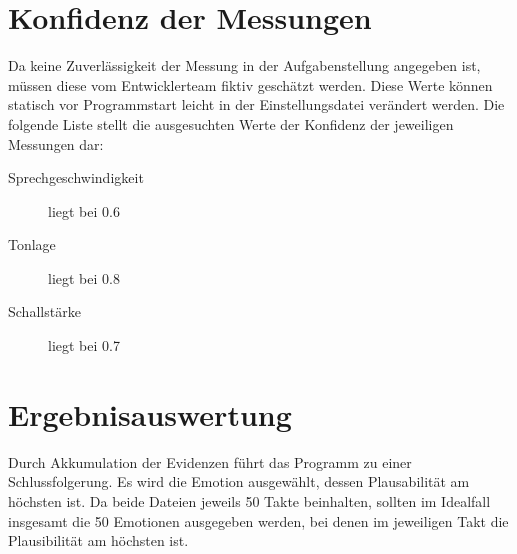 \section{Konfidenz der Messungen}
\label{konfidenzfestlegung}
Da keine Zuverlässigkeit der Messung in der Aufgabenstellung angegeben ist, müssen diese vom Entwicklerteam fiktiv geschätzt werden. Diese Werte können statisch vor Programmstart leicht in der Einstellungsdatei verändert werden. Die folgende Liste stellt die ausgesuchten Werte der Konfidenz der jeweiligen Messungen dar:
\begin{description}
\item [Sprechgeschwindigkeit] liegt bei 0.6
\item [Tonlage] liegt bei 0.8
\item [Schallstärke] liegt bei 0.7
\end{description}

\section{Ergebnisauswertung}
Durch Akkumulation der Evidenzen führt das Programm zu einer Schlussfolgerung. Es wird die Emotion ausgewählt, dessen Plausabilität am höchsten ist. Da beide Dateien jeweils 50 Takte beinhalten, sollten im Idealfall insgesamt die 50 Emotionen ausgegeben werden, bei denen im jeweiligen Takt die Plausibilität am höchsten ist.




